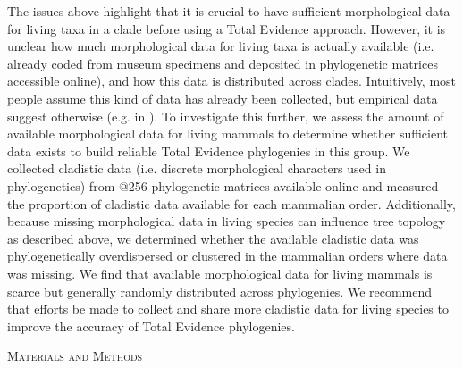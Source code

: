 \documentclass[12pt,letterpaper]{article}
\renewcommand{\section}[1]{%
\bigskip
\begin{center}
\begin{Large}
\normalfont\scshape #1
\medskip
\end{Large}
\end{center}}
\begin{document}
The issues above highlight that it is crucial to have sufficient morphological data for living taxa in a clade before using a Total Evidence approach.
However, it is unclear how much morphological data for living taxa is actually available (i.e. already coded from museum specimens and deposited in phylogenetic matrices accessible online), and how this data is distributed across clades.
Intuitively, most people assume this kind of data has already been collected, but empirical data suggest otherwise (e.g. in \cite{ronquista2012,slaterphylogenetic2013,beckancient2014}).
To investigate this further, we assess the amount of available morphological data for living mammals to determine whether sufficient data exists to build reliable Total Evidence phylogenies in this group.
We collected cladistic data (i.e. discrete morphological characters used in phylogenetics) from @256 phylogenetic matrices available online and measured the proportion of cladistic data available for each mammalian order.
Additionally, because missing morphological data in living species can influence tree topology as described above,%
we determined whether the available cladistic data was phylogenetically overdispersed or clustered in the mammalian orders where data was missing. 
We find that available morphological data for living mammals is scarce but generally randomly distributed across phylogenies. 
We recommend that efforts be made to collect and share more cladistic data for living species to improve the accuracy of Total Evidence phylogenies.

%
%
\section{Materials and Methods}
\end{document}
